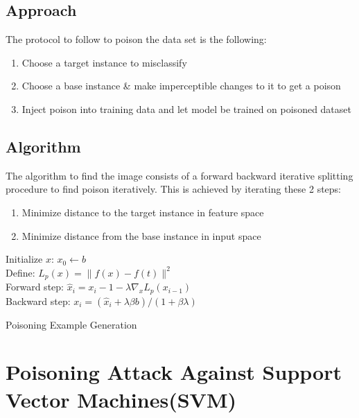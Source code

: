 \documentclass[twoside]{article}
\begin{document}
\subsection{Approach}
The protocol to follow to poison the data set is the following:

\begin{enumerate}
  \item Choose a target instance to misclassify
  \item Choose a base instance \& make imperceptible changes to it to get a poison
  \item Inject poison into training data and let model be trained on poisoned dataset
\end{enumerate}

\subsection{Algorithm}
The algorithm to find the image consists of a forward backward iterative splitting procedure to find poison iteratively. This is achieved by iterating these 2 steps:

\begin{enumerate}
  \item Minimize distance to the target instance in feature space
  \item Minimize distance from the base instance  in input space
\end{enumerate}


\begin{algorithm}[H]
\SetAlgoLined
{}
Initialize $x$: $x_{0} \longleftarrow b$\\
Define:  $L_{p}(x) = \|f(x) - f(t)\|^{2}$\\
     {
    Forward step: $\hat{x}_{i} = x_{i}-1 - \lambda \nabla_{x}L_{p}(x_{i-1})$ \\
    Backward step: $x_{i} = (\hat{x}_{i} + \lambda \beta b ) / (1 + \beta \lambda)$
    }
    \caption{Poisoning Example Generation}
\end{algorithm}

\section{Poisoning Attack Against Support Vector Machines(SVM)}
\end{document}

